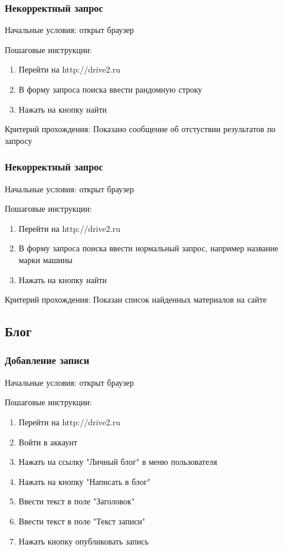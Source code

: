 \subsubsection{Некорректный запрос}

Начальные условия: открыт браузер

Пошаговые инструкции:
\begin{enumerate}
\item Перейти на http://drive2.ru
\item В форму запроса поиска ввести рандомную строку
\item Нажать на кнопку найти
\end{enumerate}

Критерий прохождения: Показано сообщение об отстуствии результатов по запросу

\subsubsection{Некорректный запрос}

Начальные условия: открыт браузер

Пошаговые инструкции:
\begin{enumerate}
\item Перейти на http://drive2.ru
\item В форму запроса поиска ввести нормальный запрос, например название марки
машины
\item Нажать на кнопку найти
\end{enumerate}

Критерий прохождения: Показан список найденных материалов на сайте

\subsection{Блог}

\subsubsection{Добавление записи}

Начальные условия: открыт браузер

Пошаговые инструкции:
\begin{enumerate}
\item Перейти на http://drive2.ru
\item Войти в аккаунт
\item Нажать на ссылку "Личный блог" в меню пользователя
\item Нажать на кнопку "Написать в блог"
\item Ввести текст в поле "Заголовок"
\item Ввести текст в поле "Текст записи"
\item Нажать кнопку опубликовать запись
\end{enumerate}

